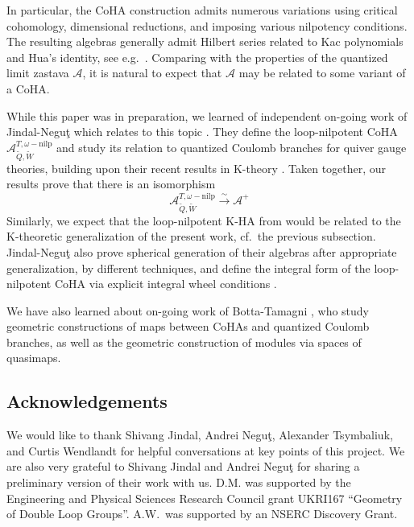 \documentclass[11pt,reqno]{amsart}
\numberwithin{equation}{section}
\theoremstyle{definition}
\newcommand{\cA}{\mathcal{A}}
\renewcommand{\tilde}[1]{\widetilde{#1}}
\newcommand{\qzast}{\cA}
\newcommand{\qzastplus}{\cA^{+}}
\begin{document}
In particular, the CoHA construction admits numerous variations using critical cohomology,  dimensional reductions, and imposing various nilpotency conditions. The resulting algebras generally admit Hilbert series related to  Kac polynomials and Hua's identity, see e.g.~\cite{BSV,SV2,Davison}.  Comparing with the  properties of the quantized limit zastava $\qzast$, it is natural to expect that  $\qzast$ may be related to some variant of a CoHA.

While this paper was in preparation, we learned of independent on-going work of Jindal-Negu{\c t} which relates to this topic \cite{JN26_2}. They define the loop-nilpotent CoHA $\mathcal{A}^{T, \omega-\text{nilp}}_{\tilde{Q}, \tilde{W}}$ and study its relation to quantized Coulomb branches for quiver gauge theories, building upon their recent results in K-theory \cite{JN26}. Taken together, our results prove that there is an isomorphism
\begin{equation}
    \mathcal{A}^{T, \omega-\text{nilp}}_{\tilde{Q}, \tilde{W}} \xrightarrow{\sim} \qzastplus
\end{equation}
Similarly, we expect that the loop-nilpotent K-HA from \cite{JN26} would be related to the K-theoretic generalization of the present work, cf.~the previous subsection.  Jindal-Negu{\c t} also prove spherical generation of their algebras after appropriate generalization, by different techniques, and define the integral form of the loop-nilpotent CoHA via explicit integral wheel conditions \cite[Definition 2.3, Theorem 2.4]{JN26_2}.


We have also learned about on-going work of Botta-Tamagni \cite{BT}, who study geometric constructions of maps between CoHAs and quantized Coulomb branches, as well as the geometric construction of modules via spaces of quasimaps.



\subsection*{Acknowledgements}
We would like to thank Shivang Jindal, Andrei Negu{\c t}, Alexander Tsymbaliuk, and  Curtis Wendlandt for helpful conversations at key points of this project. We are also very grateful to Shivang Jindal and Andrei Negu{\c t} for sharing a preliminary version of their work with us. D.M. was supported by the Engineering and Physical Sciences Research Council grant UKRI167 ``Geometry of Double Loop Groups''. A.W.~was supported by an NSERC Discovery Grant.
\end{document}
